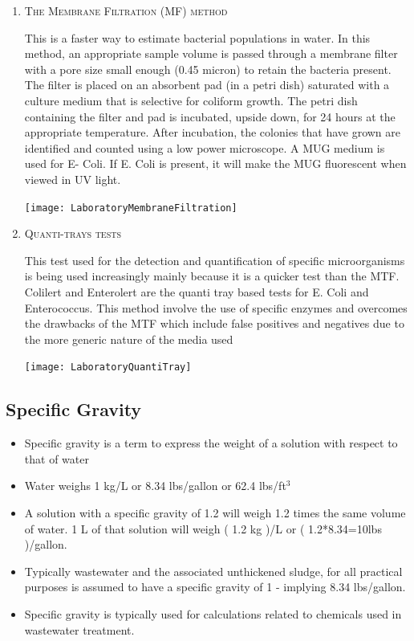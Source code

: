 \begin{enumerate}
\item \noindent\textsc{The Membrane Filtration (MF) method}

This is a faster way to estimate bacterial populations in water.  In this method, an appropriate sample volume is passed through a membrane filter with a pore size small enough (0.45 micron) to retain the bacteria present. The filter is placed on an absorbent pad (in a petri dish) saturated with a culture medium that is selective for coliform growth. The petri dish containing the filter and pad is incubated, upside down, for 24 hours at the appropriate temperature. After incubation, the colonies that have grown are identified and counted using a low power microscope. A MUG medium is used for E- Coli.  If E. Coli is present, it will make the MUG fluorescent when viewed in UV light. 
\begin{center}
\texttt{[image: LaboratoryMembraneFiltration]}
\end{center}
\pagebreak


\item \noindent\textsc{Quanti-trays tests}

This test used for the detection and quantification of specific microorganisms is being used increasingly mainly because it is a quicker test than the MTF.  Colilert and Enterolert are the quanti tray based tests for E. Coli and Enterococcus.  This method involve the use of specific enzymes and overcomes the drawbacks of the MTF which include false positives and negatives due to the more generic nature of the media used
\begin{center}
\texttt{[image: LaboratoryQuantiTray]}
\end{center}

\end{enumerate}


\subsection{Specific Gravity}				
			\begin{itemize}
				\item Specific gravity is a term to express the weight of a solution with respect to that of water
				\item Water weighs 1 kg/L or 8.34 lbs/gallon or 62.4 lbs/ft$^3$
				\item A solution with a specific gravity of 1.2 will weigh 1.2 times the same volume of water.  1 L of that solution will weigh ( 1.2 kg )/L  or  ( 1.2*8.34=10lbs )/gallon.
				\item Typically wastewater and the associated unthickened sludge, for all practical purposes is assumed to have a specific gravity of 1 - implying 8.34 lbs/gallon.
				\item Specific gravity is typically used for calculations related to chemicals used in wastewater treatment.
			\end{itemize}
			
